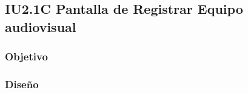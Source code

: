 \newpage
\subsection{IU2.1C Pantalla de Registrar Equipo audiovisual}

\subsubsection{Objetivo}

\subsubsection{Diseño}

